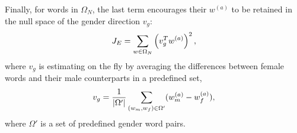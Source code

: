 

Finally, for words in $\Omega_N$, 
the last term encourages their $w^{(a)}$ to be retained in the null space of the gender direction $v_g$:
\begin{equation*}
    J_E = \sum_{w\in \Omega_N}\left(v_g^T w^{(a)}\right)^2,
    \vspace{-3pt}
\end{equation*}
where $v_g$ is estimating on the fly by averaging the differences between female words 
and their male counterparts in a predefined set,%
\begin{equation*}
v_g = \frac{1}{|\Omega'|}\sum_{(w_m,w_f)\in \Omega'} (w_m^{(a)} - w_f^{(a)}),
\vspace{-3pt}
\end{equation*}
where $\Omega'$ is a set of predefined gender word pairs.

